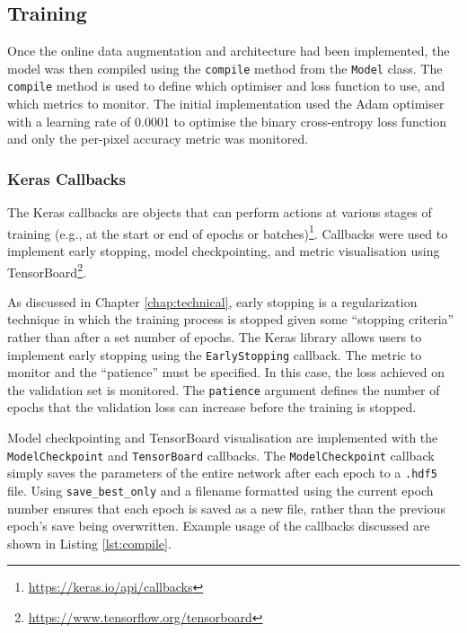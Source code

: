 \subsection{Training}

Once the online data augmentation and architecture had been implemented, the model was then compiled using the \texttt{compile} method from the \texttt{Model} class. The \texttt{compile} method is used to define which optimiser and loss function to use, and which metrics to monitor. The initial implementation used the Adam optimiser with a learning rate of 0.0001 to optimise the binary cross-entropy loss function and only the per-pixel accuracy metric was monitored.



\subsubsection{Keras Callbacks}

The Keras callbacks are objects that can perform actions at various stages of training (e.g., at the start or end of epochs or batches)\footnote{\url{https://keras.io/api/callbacks}}. Callbacks were used to implement early stopping, model checkpointing, and metric visualisation using TensorBoard\footnote{\url{https://www.tensorflow.org/tensorboard}}.

As discussed in Chapter \ref{chap:technical}, early stopping is a regularization technique in which the training process is stopped given some ``stopping criteria'' rather than after a set number of epochs. The Keras library allows users to implement early stopping using the \texttt{EarlyStopping} callback. The metric to monitor and the ``patience'' must be specified. In this case, the loss achieved on the validation set is monitored. The \texttt{patience} argument defines the number of epochs that the validation loss can increase before the training is stopped.

Model checkpointing and TensorBoard visualisation are implemented with the \texttt{ModelCheckpoint} and \texttt{TensorBoard} callbacks. The \texttt{ModelCheckpoint} callback simply saves the parameters of the entire network after each epoch to a \texttt{.hdf5} file. Using \texttt{save\_best\_only} and a filename formatted using the current epoch number ensures that each epoch is saved as a new file, rather than the previous epoch's save being overwritten. Example usage of the callbacks discussed are shown in Listing \ref{lst:compile}.

